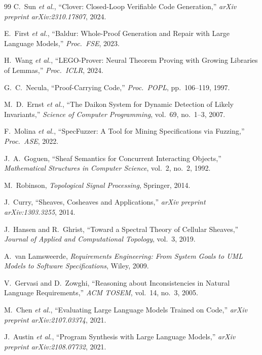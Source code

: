 \documentclass[11pt]{article}
\begin{document}
\begin{thebibliography}{99}
C.~Sun \emph{et al.},
``Clover: Closed-Loop Verifiable Code Generation,''
\emph{arXiv preprint arXiv:2310.17807}, 2024.

E.~First \emph{et al.},
``Baldur: Whole-Proof Generation and Repair with Large Language Models,''
\emph{Proc.\ FSE}, 2023.

H.~Wang \emph{et al.},
``LEGO-Prover: Neural Theorem Proving with Growing Libraries of Lemmas,''
\emph{Proc.\ ICLR}, 2024.

G.~C.~Necula,
``Proof-Carrying Code,''
\emph{Proc.\ POPL}, pp.~106--119, 1997.

M.~D.~Ernst \emph{et al.},
``The Daikon System for Dynamic Detection of Likely Invariants,''
\emph{Science of Computer Programming}, vol.~69, no.~1--3, 2007.

F.~Molina \emph{et al.},
``SpecFuzzer: A Tool for Mining Specifications via Fuzzing,''
\emph{Proc.\ ASE}, 2022.

J.~A.~Goguen,
``Sheaf Semantics for Concurrent Interacting Objects,''
\emph{Mathematical Structures in Computer Science}, vol.~2, no.~2, 1992.

M.~Robinson,
\emph{Topological Signal Processing},
Springer, 2014.

J.~Curry,
``Sheaves, Cosheaves and Applications,''
\emph{arXiv preprint arXiv:1303.3255}, 2014.

J.~Hansen and R.~Ghrist,
``Toward a Spectral Theory of Cellular Sheaves,''
\emph{Journal of Applied and Computational Topology}, vol.~3, 2019.

A.~van Lamsweerde,
\emph{Requirements Engineering: From System Goals to UML Models to
Software Specifications},
Wiley, 2009.

V.~Gervasi and D.~Zowghi,
``Reasoning about Inconsistencies in Natural Language Requirements,''
\emph{ACM TOSEM}, vol.~14, no.~3, 2005.

M.~Chen \emph{et al.},
``Evaluating Large Language Models Trained on Code,''
\emph{arXiv preprint arXiv:2107.03374}, 2021.

J.~Austin \emph{et al.},
``Program Synthesis with Large Language Models,''
\emph{arXiv preprint arXiv:2108.07732}, 2021.


\end{thebibliography}
\end{document}
